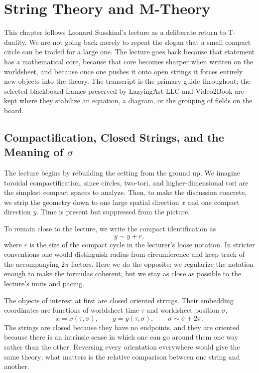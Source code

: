 \chapter{String Theory and M-Theory}

This chapter follows Leonard Susskind's lecture as a deliberate return to T-duality. We are not going back merely to repeat the slogan that a small compact circle can be traded for a large one. The lecture goes back because that statement has a mathematical core, because that core becomes sharper when written on the worldsheet, and because once one pushes it onto open strings it forces entirely new objects into the theory. The transcript is the primary guide throughout; the selected blackboard frames preserved by LazyingArt LLC and Video2Book are kept where they stabilize an equation, a diagram, or the grouping of fields on the board.

\section{Compactification, Closed Strings, and the Meaning of \(\sigma\)}

The lecture begins by rebuilding the setting from the ground up. We imagine toroidal compactification, since circles, two-tori, and higher-dimensional tori are the simplest compact spaces to analyze. Then, to make the discussion concrete, we strip the geometry down to one large spatial direction \(x\) and one compact direction \(y\). Time is present but suppressed from the picture.

To remain close to the lecture, we write the compact identification as
\begin{equation}
y \sim y+r,
\end{equation}
where \(r\) is the size of the compact cycle in the lecturer's loose notation. In stricter conventions one would distinguish radius from circumference and keep track of the accompanying \(2\pi\) factors. Here we do the opposite: we regularize the notation enough to make the formulas coherent, but we stay as close as possible to the lecture's units and pacing.

The objects of interest at first are closed oriented strings. Their embedding coordinates are functions of worldsheet time \(\tau\) and worldsheet position \(\sigma\),
\begin{equation}
x=x(\tau,\sigma), \qquad y=y(\tau,\sigma), \qquad \sigma\sim \sigma+2\pi.
\end{equation}
The strings are closed because they have no endpoints, and they are oriented because there is an intrinsic sense in which one can go around them one way rather than the other. Reversing every orientation everywhere would give the same theory; what matters is the relative comparison between one string and another.

